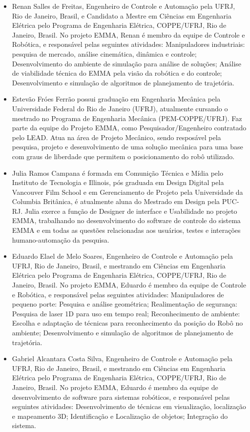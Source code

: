 \begin{itemize}
  \item Renan Salles de Freitas, Engenheiro de Controle e
Automação pela UFRJ, Rio de Janeiro, Brasil, e Candidato a Mestre em Ciências em Engenharia Elétrica
pelo Programa de Engenharia Elétrica, COPPE/UFRJ, Rio de Janeiro, Brasil. No
projeto EMMA, Renan é membro da equipe de Controle e Robótica, e responsável
pelas seguintes atividades: Manipuladores industriais: pesquisa de
mercado, análise cinemática, dinâmica e controle; Desenvolvimento do ambiente de
simulação para análise de soluções; Análise de viabilidade técnica do EMMA pela
visão da robótica e do controle; Desenvolvimento e simulação de algoritmos de
planejamento de trajetória.

  \item Estevão Fróes Ferrão possui graduação em Engenharia Mecânica pela Universidade
Federal do Rio de Janeiro (UFRJ), atualmente cursando o mestrado no Programa de Engenharia
Mecânica (PEM-COPPE/UFRJ). Faz parte da equipe do Projeto EMMA, como
Pesquisador/Engenheiro contratado pelo LEAD. Atua na área de Projeto Mecânico,
sendo resposável pela pesquisa, projeto e desenvolvimento de uma solução
mecânica para uma base com graus de liberdade que permitem o posicionamento do
robô utilizado.

\item Julia Ramos Campana é formada em Comunição Técnica e Mídia pelo Instituto de
Tecnologia e Illinois, pós graduada em Design Digital pela Vancouver Film School
e em Gerenciamento de Projeto pela Universidade da Columbia Britânica, é
atualmente aluna do Mestrado em Design pela PUC-RJ. Julia exerce a função de
Designer de interface e Usabilidade no projeto EMMA, trabalhando no
desenvolvimento do software de controle do sistema EMMA e em todas as questões
relacionadas aos usuários, testes e interações humano-automação da pesquisa.
\item Eduardo Elael de Melo Soares, Engenheiro de Controle e Automação pela UFRJ, Rio
de Janeiro, Brasil, e mestrando em Ciências em Engenharia Elétrica pelo
Programa de Engenharia Elétrica, COPPE/UFRJ, Rio de Janeiro, Brasil. No projeto
EMMA, Eduardo é membro da equipe de Controle e Robótica, e responsável pelas
seguintes atividades: Manipuladores de pequeno porte: Pesquisa e análise
geométrica; Realimentação de segurança: Pesquisa de laser 1D para uso em tempo
real; Reconhecimento de ambiente: Escolha e adaptação de técnicas para
reconhecimento da posição do Robô no ambiente; Desenvolvimento e simulação de
algoritmos de planejamento de trajetória.
\item Gabriel Alcantara Costa Silva, Engenheiro de Controle e Automação pela
UFRJ, Rio de Janeiro, Brasil, e mestrando em Ciências em Engenharia Elétrica pelo
Programa de Engenharia Elétrica, COPPE/UFRJ, Rio de Janeiro, Brasil. No projeto
EMMA, Eduardo é membro da equipe de desenvolvimento de software para sistemas
robóticos, e responsável pelas seguintes atividades: Desenvolvimento de técnicas
em visualização, localização e mapeamento 3D; Identificação e
Localização de objetos; Integração do sistema.

\end{itemize}








    
    
  
